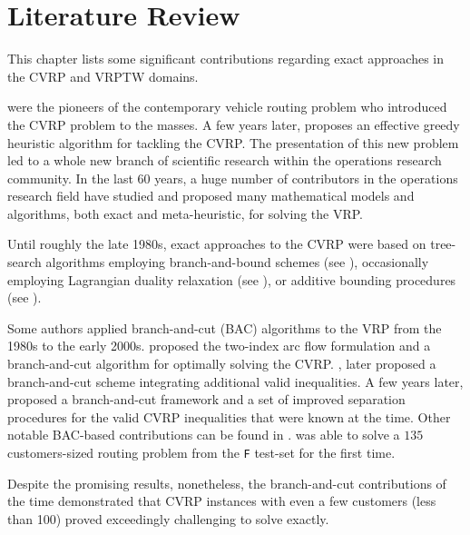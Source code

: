 \chapter{Literature Review}
\label{sec:intro-literature-review}

This chapter lists some significant contributions regarding exact approaches
in the CVRP and VRPTW domains.

\Textcite{dantzig1959} were
the pioneers of the contemporary vehicle routing problem who
introduced the CVRP problem to the masses.
A few years later, \textcite{clarke1964} proposes
an effective greedy heuristic algorithm for tackling the CVRP.
The presentation of this new problem led to a whole new branch
of scientific research within the operations research community.
In the last 60 years, a huge number of contributors in
the operations research field have studied and proposed many
mathematical models and algorithms, both exact and meta-heuristic,
for solving the VRP.

Until roughly the late 1980s, exact approaches to the CVRP were
based on tree-search algorithms employing branch-and-bound schemes
(see \cite{pierce1969, christofides1969, christofides1981exact, laporte1986}),
occasionally employing Lagrangian duality relaxation (see \cite{fisher1994, miller1995}),
or additive bounding procedures (see \cite{fischetti1994a, hadjiconstantinou1995}).

Some authors applied branch-and-cut (BAC) algorithms  to the VRP from the 1980s to the early 2000s.
\textcite{laporte1983, laporte1985} proposed the two-index arc flow formulation
and a branch-and-cut algorithm for optimally solving the CVRP.
\Textcite{augerat1995approche}, later proposed a branch-and-cut scheme
integrating additional valid inequalities.
A few years later, \textcite{lysgaard2004}
proposed a branch-and-cut framework and
a set of improved separation procedures for the valid CVRP inequalities that were known at the time.
Other notable BAC-based contributions
can be found in \textcite{araqueg1994, augerat1995, achuthan1996, blasum2000, ralphs2003, achuthan2003, baldacci2004}.
\citeauthor{baldacci2004} was able to solve a $135$ customers-sized routing problem
from the \texttt{F} test-set \parencite{fisher1994}
for the first time.

Despite the promising results, nonetheless,
the branch-and-cut contributions of the time demonstrated
that CVRP instances with even a few customers (less than 100)
proved exceedingly challenging to solve exactly.

